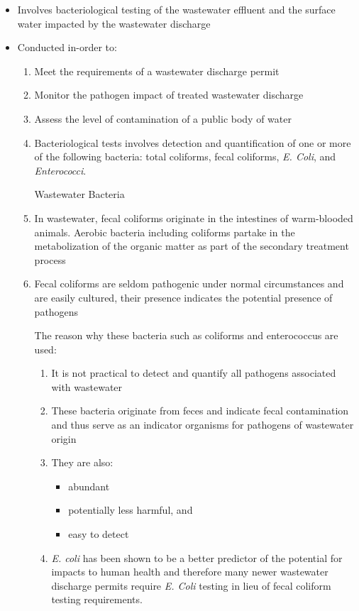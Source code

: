 \begin{itemize}
	\item Involves bacteriological testing of the wastewater effluent and the surface water impacted by the wastewater discharge
	
	\item Conducted in-order to:
		\begin{enumerate}
			\item Meet the requirements of a wastewater discharge permit
			\item Monitor the pathogen impact of treated wastewater discharge
			\item Assess the level of contamination of a public body of water
			\item Bacteriological tests involves detection and quantification of one or more of the following bacteria:  total coliforms, fecal coliforms, \textit{E. Coli}, and \textit{Enterococci}. 
\begin{center}
Wastewater Bacteria
\end{center}
	
	\item  In wastewater, fecal coliforms originate in the intestines of warm-blooded animals.  Aerobic bacteria including coliforms partake in the metabolization of the organic matter as part of the secondary treatment process
\item Fecal coliforms are seldom pathogenic under normal circumstances and are easily cultured, their presence indicates the potential presence of pathogens

The reason why these bacteria such as coliforms and enterococcus are used:
		\begin{enumerate}
			\item It is not practical to detect and quantify all pathogens associated with wastewater
			\item These bacteria originate from feces and indicate fecal contamination and thus serve as an indicator organisms for pathogens of wastewater origin
			\item They are also:
				\begin{itemize}
					\item abundant
					\item potentially less harmful, and
					\item easy to detect
				\end{itemize}
			\item \textit{E. coli} has been shown to be a better predictor of the potential for impacts to human health and therefore many newer wastewater discharge permits require \textit{E. Coli} testing in lieu of fecal coliform testing requirements.
		\end{enumerate}
		\end{enumerate}

\end{itemize}
 

